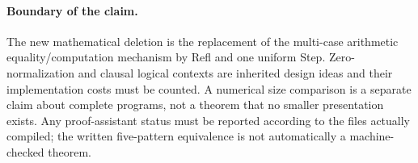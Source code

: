 \paragraph{Boundary of the claim.}
The new mathematical deletion is the replacement of the multi-case
arithmetic equality/computation mechanism by Refl and one uniform Step.
Zero-normalization and clausal logical contexts are inherited design
ideas and their implementation costs must be counted. A numerical size
comparison is a separate claim about complete programs, not a theorem
that no smaller presentation exists. Any proof-assistant status must be
reported according to the files actually compiled; the written
five-pattern equivalence is not automatically a machine-checked theorem.

